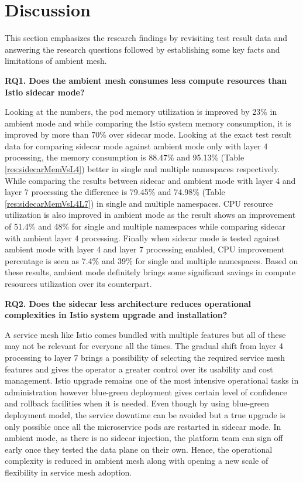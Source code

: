 \section{Discussion}
This section emphasizes the research findings by revisiting test result data and answering the research questions followed by establishing some key facts and limitations of ambient mesh.

\textbf{RQ1. Does the ambient mesh consumes less compute resources than Istio sidecar mode?}

Looking at the numbers, the pod memory utilization is improved by 23\% in ambient mode and while comparing the Istio system memory consumption, it is improved by more than 70\% over sidecar mode. Looking at the exact test result data for comparing sidecar mode against ambient mode only with layer 4 processing, the memory consumption is 88.47\% and 95.13\% (Table \ref{res:sidecarMemVsL4}) better in single and multiple namespaces respectively. While comparing the results between sidecar and ambient mode with layer 4 and layer 7 processing the difference is 79.45\% and 74.98\% (Table \ref{res:sidecarMemVsL4L7}) in single and multiple namespaces. CPU resource utilization is also improved in ambient mode as the result shows an improvement of 51.4\% and 48\% for single and multiple namespaces while comparing sidecar with ambient layer 4 processing. Finally when sidecar mode is tested against ambient mode with layer 4 and layer 7 processing enabled, CPU improvement percentage is seen as 7.4\% and 39\% for single and multiple namespaces. Based on these results, ambient mode definitely brings some significant savings in compute resources utilization over its counterpart.

\textbf{RQ2. Does the sidecar less architecture reduces operational complexities in Istio system upgrade and installation?}

A service mesh like Istio comes bundled with multiple features but all of these may not be relevant for everyone all the times. The gradual shift from layer 4 processing to layer 7 brings a possibility of selecting the required service mesh features and gives the operator a greater control over its usability and cost management. Istio upgrade remains one of the most intensive operational tasks in administration however blue-green deployment gives certain level of confidence and rollback facilities when it is needed. Even though by using blue-green deployment model, the service downtime can be avoided but a true upgrade is only possible once all the microservice pods are restarted in sidecar mode. In ambient mode, as there is no sidecar injection, the platform team can sign off early once they tested the data plane on their own. Hence, the operational complexity is reduced in ambient mesh along with opening a new scale of flexibility in service mesh adoption.

